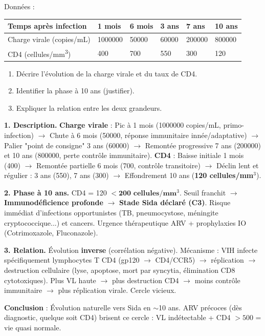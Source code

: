 \documentclass[11pt]{article}
\begin{document}
\begin{exoresolu}
Données :
\begin{center}
\begin{tabularx}{\linewidth}{|l|X|X|X|X|X|}
\hline
\rowcolor{popblueL} Temps après infection & 1 mois & 6 mois & 3 ans & 7 ans & 10 ans \\
\hline
Charge virale (copies/mL) & \num{1000000} & \num{50000} & \num{60000} & \num{200000} & \num{800000} \\
\hline
CD4 (cellules/mm\textsuperscript{3}) & 400 & 700 & 550 & 300 & 120 \\
\hline
\end{tabularx}
\end{center}
\begin{enumerate}
\item Décrire l'évolution de la charge virale et du taux de CD4.
\item Identifier la phase à 10 ans (justifier).
\item Expliquer la relation entre les deux grandeurs.
\end{enumerate}
\tcblower
\textbf{1. Description.}
\textbf{Charge virale} : Pic à 1 mois (\num{1000000} copies/mL, primo-infection) $\rightarrow$ Chute à 6 mois (\num{50000}, réponse immunitaire innée/adaptative) $\rightarrow$ Palier "point de consigne" 3 ans (\num{60000}) $\rightarrow$ Remontée progressive 7 ans (\num{200000}) et 10 ans (\num{800000}, perte contrôle immunitaire).
\textbf{CD4} : Baisse initiale 1 mois (400) $\rightarrow$ Remontée partielle 6 mois (700, contrôle transitoire) $\rightarrow$ Déclin lent et régulier : 3 ans (550), 7 ans (300) $\rightarrow$ Effondrement 10 ans (\textbf{120 cellules/mm$^3$}).

\textbf{2. Phase à 10 ans.}
CD4 = 120 $< \textbf{200 cellules/mm$^3$}$. Seuil franchit $\rightarrow$ \textbf{Immunodéficience profonde} $\rightarrow$ \textbf{Stade Sida déclaré (C3)}. Risque immédiat d'infections opportunistes (TB, pneumocystose, méningite cryptococcique...) et cancers. Urgence thérapeutique ARV + prophylaxies IO (Cotrimoxazole, Fluconazole).

\textbf{3. Relation.}
Évolution \textbf{inverse} (corrélation négative). Mécanisme : VIH infecte spécifiquement lymphocytes T CD4 (gp120 $\rightarrow$ CD4/CCR5) $\rightarrow$ réplication $\rightarrow$ destruction cellulaire (lyse, apoptose, mort par syncytia, élimination CD8 cytotoxiques). Plus VL haute $\rightarrow$ plus destruction CD4 $\rightarrow$ moins contrôle immunitaire $\rightarrow$ plus réplication virale. Cercle vicieux.

\textbf{Conclusion} : Évolution naturelle vers Sida en $\sim$10 ans. ARV précoces (dès diagnostic, quelque soit CD4) brisent ce cercle : VL indétectable + CD4 $> 500$ = vie quasi normale.
\end{exoresolu}
\end{document}
